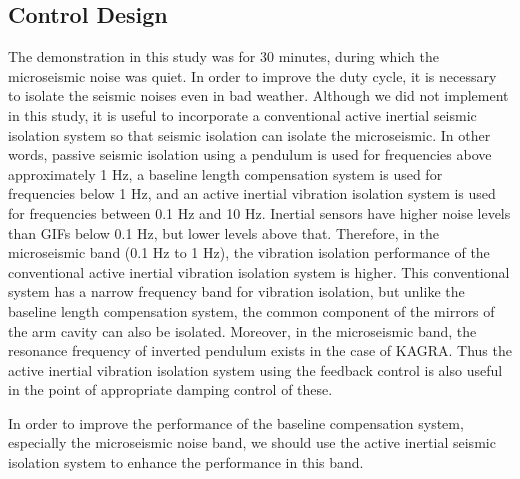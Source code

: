 \subsection{Control Design} \label{sec:444}
The demonstration in this study was for 30 minutes, during which the microseismic noise was quiet. In order to improve the duty cycle, it is necessary to isolate the seismic noises even in bad weather. Although we did not implement in this study, it is useful to incorporate a conventional active inertial seismic isolation system so that seismic isolation can isolate the microseismic. In other words, passive seismic isolation using a pendulum is used for frequencies above approximately 1 Hz, a baseline length compensation system is used for frequencies below 1 Hz, and an active inertial vibration isolation system is used for frequencies between 0.1 Hz and 10 Hz. Inertial sensors have higher noise levels than GIFs below 0.1 Hz, but lower levels above that. Therefore, in the microseismic band (0.1 Hz to 1 Hz), the vibration isolation performance of the conventional active inertial vibration isolation system is higher. This conventional system has a narrow frequency band for vibration isolation, but unlike the baseline length compensation system, the common component of the mirrors of the arm cavity can also be isolated. Moreover,  in the microseismic band, the resonance frequency of inverted pendulum exists in the case of KAGRA. Thus the active inertial vibration isolation system using the feedback control is also useful in the point of appropriate damping control of these.

In order to improve the performance of the baseline compensation system, especially the microseismic noise band, we should use the active inertial seismic isolation system to enhance the performance in this band. 



